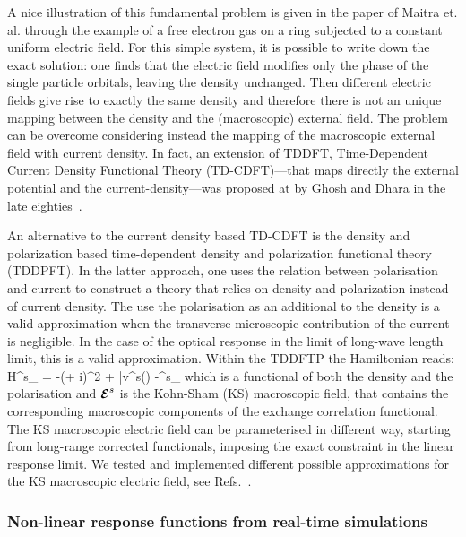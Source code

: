 A nice illustration of this fundamental problem is given in the paper of Maitra et. al.\cite{maitra2003current} through the example of a free electron gas on a ring subjected to a constant uniform electric field. For this simple system, it is possible to write down the exact solution: one finds that the electric field modifies only the phase of the single particle orbitals, leaving the density unchanged. Then different electric fields  give rise to exactly the same density and therefore there is not an unique mapping between the density and the (macroscopic) external field.  The problem can be overcome considering instead the mapping of the macroscopic external field with current density. In fact, an extension of TDDFT, Time-Dependent Current Density Functional Theory (TD-CDFT)---that maps directly the external potential and the current-density---was proposed at by Ghosh and Dhara in the late eighties~\cite{PhysRevA.38.1149}. 

An alternative to the current density based TD-CDFT is the density and polarization based time-dependent density and polarization functional theory (TDDPFT). In the latter approach, one uses the relation between polarisation and current to construct a theory that relies on density and polarization instead of current density. The use the polarisation as an additional to the density is a valid approximation when the transverse microscopic contribution of the current is negligible. In the case of the optical response in the limit of long-wave length limit, this is a valid approximation. Within the TDDFTP the Hamiltonian reads:
\be \label{eq:dpftks}
H^{s}_\kk
= -\left(\nabla + i\kk\right )^2 + \bar v^{s}(\rr) -\Omega\Efield^{s}\cdot \nabla_\kk %
\ee
which is a functional of both the density and the polarisation and $\boldsymbol{\cal E}^{s}$ is the Kohn-Sham (KS) macroscopic field, that contains the corresponding macroscopic components of the exchange correlation functional. The KS macroscopic electric field can be parameterised in different way, starting from long-range corrected functionals, imposing the exact constraint in the linear response limit. We tested and implemented different possible approximations for the KS macroscopic electric field, see Refs.~.


\subsubsection{Non-linear response functions from real-time simulations}\label{sc:compdet}

